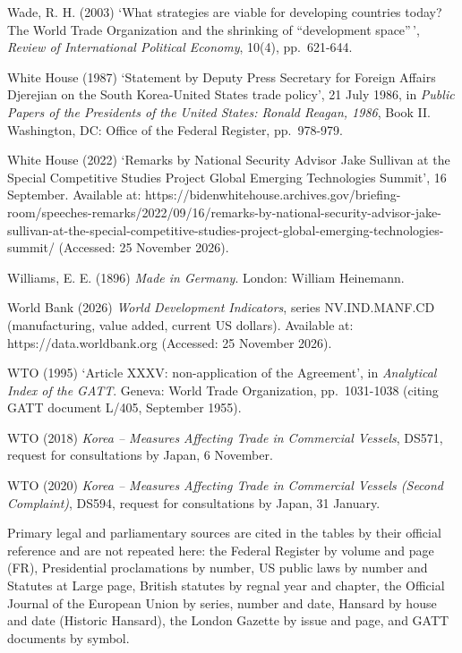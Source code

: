 Wade, R. H. (2003) `What strategies are viable for developing countries
today? The World Trade Organization and the shrinking of ``development
space''\,', \emph{Review of International Political Economy}, 10(4),
pp.~621-644.

White House (1987) `Statement by Deputy Press Secretary for Foreign
Affairs Djerejian on the South Korea-United States trade policy', 21
July 1986, in \emph{Public Papers of the Presidents of the United
States: Ronald Reagan, 1986}, Book II. Washington, DC: Office of the
Federal Register, pp.~978-979.

White House (2022) `Remarks by National Security Advisor Jake Sullivan
at the Special Competitive Studies Project Global Emerging Technologies
Summit', 16 September. Available at:
https://bidenwhitehouse.archives.gov/briefing-room/speeches-remarks/2022/09/16/remarks-by-national-security-advisor-jake-sullivan-at-the-special-competitive-studies-project-global-emerging-technologies-summit/
(Accessed: 25 November 2026).

Williams, E. E. (1896) \emph{Made in Germany}. London: William
Heinemann.

World Bank (2026) \emph{World Development Indicators}, series
NV.IND.MANF.CD (manufacturing, value added, current US dollars).
Available at: https://data.worldbank.org (Accessed: 25 November 2026).

WTO (1995) `Article XXXV: non-application of the Agreement', in
\emph{Analytical Index of the GATT}. Geneva: World Trade Organization,
pp.~1031-1038 (citing GATT document L/405, September 1955).

WTO (2018) \emph{Korea -- Measures Affecting Trade in Commercial
Vessels}, DS571, request for consultations by Japan, 6 November.

WTO (2020) \emph{Korea -- Measures Affecting Trade in Commercial Vessels
(Second Complaint)}, DS594, request for consultations by Japan, 31
January.

Primary legal and parliamentary sources are cited in the tables by their
official reference and are not repeated here: the Federal Register by
volume and page (FR), Presidential proclamations by number, US public
laws by number and Statutes at Large page, British statutes by regnal
year and chapter, the Official Journal of the European Union by series,
number and date, Hansard by house and date (Historic Hansard), the
London Gazette by issue and page, and GATT documents by symbol.
